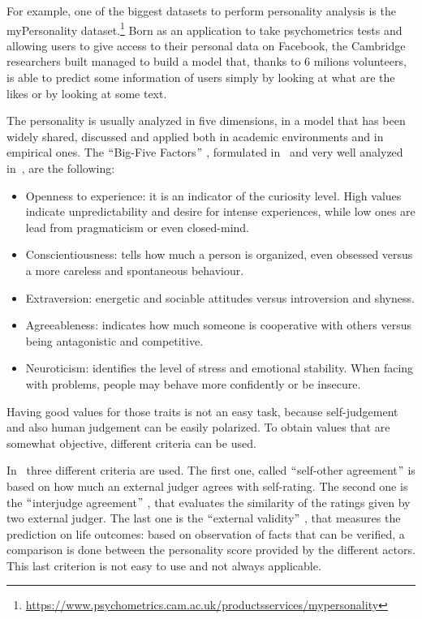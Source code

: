 For example, one of the biggest datasets to perform personality analysis is the myPersonality dataset.\footnote{\url{https://www.psychometrics.cam.ac.uk/productsservices/mypersonality}} Born as an application to take psychometrics tests and allowing users to give access to their personal data on Facebook, the Cambridge researchers built managed to build a model that, thanks to 6 milions volunteers, is able to predict some information of users simply by looking at what are the likes or by looking at some text.

The personality is usually analyzed in five dimensions, in a model that has been widely shared, discussed and applied both in academic environments and in empirical ones. The $``$Big-Five Factors$"$ , formulated in~\cite{costa2008revised} and very well analyzed in~\cite{goldberg1993structure}, are the following:

\begin{itemize}
	\item Openness to experience: it is an indicator of the curiosity level. High values indicate unpredictability and desire for intense experiences, while low ones are lead from pragmaticism or even closed-mind.

	\item Conscientiousness: tells how much a person is organized, even obsessed versus a more careless and spontaneous behaviour.

	\item Extraversion: energetic and sociable attitudes versus introversion and shyness.

	\item Agreeableness: indicates how much someone is cooperative with others versus being antagonistic and competitive.

	\item Neuroticism: identifies the level of stress and emotional stability. When facing with problems, people may behave more confidently or be insecure.
\end{itemize}

Having good values for those traits is not an easy task, because self-judgement and also human judgement can be easily polarized. To obtain values that are somewhat objective, different criteria can be used.

In~\cite{youyou2015computer} three different criteria are used. The first one, called $``$self-other agreement$"$  is based on how much an external judger agrees with self-rating. The second one is the $``$interjudge agreement$"$ , that evaluates the similarity of the ratings given by two external judger. The last one is the $``$external validity$"$ , that measures the prediction on life outcomes: based on observation of facts that can be verified, a comparison is done between the personality score provided by the different actors. This last criterion is not easy to use and not always applicable.


